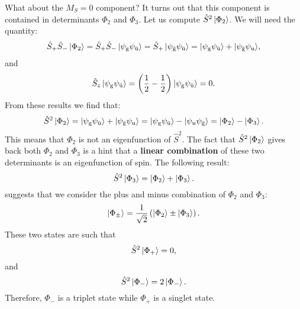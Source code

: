 \documentclass[../Main/chem532-notes.tex]{subfiles}
\begin{document}
What about the $M_S = 0$ component?  It turns out that this component is contained in determinants $\Phi_2$ and $\Phi_3$.
Let us compute $\hat{S}^2 \ket{\Phi_2}$. We will need the quantity:
\begin{equation}
\begin{split}
\hat{S}_{+} \hat{S}_{-} \ket{\Phi_2}
= \hat{S}_{+} \hat{S}_{-} \ket{\psi_{\mathrm{g}}\psi_{\bar{\mathrm{u}}}}
= \hat{S}_{+} \ket{\psi_{\bar{\mathrm{g}}}\psi_{\bar{\mathrm{u}}}}
= \ket{\psi_{\mathrm{g}}\psi_{\bar{\mathrm{u}}}} + \ket{\psi_{\bar{\mathrm{g}}}\psi_{\mathrm{u}}}
\end{split},
\end{equation}
and
\begin{equation}
\hat{S}_{z} \ket{\psi_{\mathrm{g}}\psi_{\bar{\mathrm{u}}}}
= \left(\frac{1}{2} - \frac{1}{2}\right) \ket{\psi_{\mathrm{g}}\psi_{\bar{\mathrm{u}}}} = 0.
\end{equation}
From these results we find that:
\begin{equation}
\hat{S}^2 \ket{\Phi_2} = \ket{\psi_{\mathrm{g}}\psi_{\bar{\mathrm{u}}}} + \ket{\psi_{\bar{\mathrm{g}}}\psi_{\mathrm{u}}} 
= \ket{\psi_{\mathrm{g}}\psi_{\bar{\mathrm{u}}}} - \ket{\psi_{\mathrm{u}}\psi_{\bar{\mathrm{g}}}} = 
\ket{\Phi_2} - \ket{\Phi_3}.
\end{equation}
This means that $\Phi_2$ is not an eigenfunction of $\hat{S}^2$.
The fact that $\hat{S}^2 \ket{\Phi_2}$ gives back both $\Phi_2$ and $\Phi_3$ is a hint that a \textbf{linear combination} of these two determinants is an eigenfunction of spin.
The following result:
\begin{equation}
\hat{S}^2 \ket{\Phi_3} = \ket{\Phi_2} + \ket{\Phi_3}.
\end{equation}
suggests that we consider the plus and minus combination of $\Phi_2$ and $\Phi_3$:
\begin{equation}
\ket{\Phi_\pm} = \frac{1}{\sqrt{2}} \left(  \ket{\Phi_2} \pm \ket{\Phi_3} \right).
\end{equation}
These two states are such that
\begin{equation}
\hat{S}^2 \ket{\Phi_+} = 0,
\end{equation}
and
\begin{equation}
\hat{S}^2 \ket{\Phi_{-}} = 2 \ket{\Phi_{-}}.
\end{equation}
Therefore, $\Phi_{-}$ is a triplet state while $\Phi_{+}$ is a singlet state.
\end{document}
